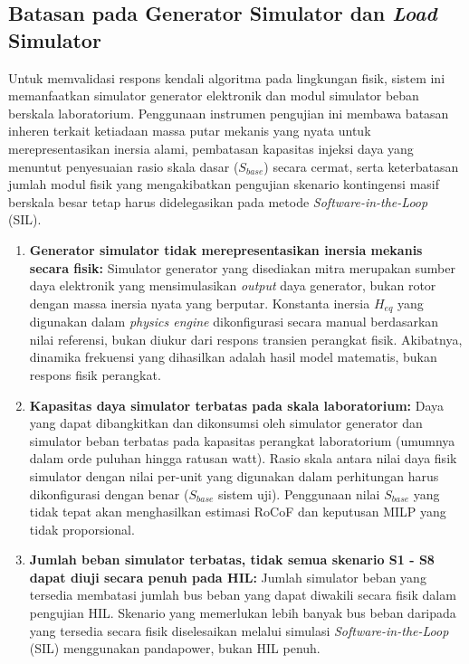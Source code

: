 \subsection{Batasan pada Generator Simulator dan \textit{Load} Simulator}
\label{subsec:Batasan_pada_Generator_Simulator_dan_Load_Simulator}

Untuk memvalidasi respons kendali algoritma pada lingkungan fisik, sistem ini memanfaatkan simulator generator elektronik dan modul simulator beban berskala laboratorium. Penggunaan instrumen pengujian ini membawa batasan inheren terkait ketiadaan massa putar mekanis yang nyata untuk merepresentasikan inersia alami, pembatasan kapasitas injeksi daya yang menuntut penyesuaian rasio skala dasar ($S_{base}$) secara cermat, serta keterbatasan jumlah modul fisik yang mengakibatkan pengujian skenario kontingensi masif berskala besar tetap harus didelegasikan pada metode \textit{Software-in-the-Loop} (SIL).

\begin{enumerate}
    \item[a.] \textbf{Generator simulator tidak merepresentasikan inersia mekanis secara fisik:} Simulator generator yang disediakan mitra merupakan sumber daya elektronik yang mensimulasikan \textit{output} daya generator, bukan rotor dengan massa inersia nyata yang berputar. Konstanta inersia $H_{eq}$ yang digunakan dalam \textit{physics engine} dikonfigurasi secara manual berdasarkan nilai referensi, bukan diukur dari respons transien perangkat fisik. Akibatnya, dinamika frekuensi yang dihasilkan adalah hasil model matematis, bukan respons fisik perangkat.
    \item[b.] \textbf{Kapasitas daya simulator terbatas pada skala laboratorium:} Daya yang dapat dibangkitkan dan dikonsumsi oleh simulator generator dan simulator beban terbatas pada kapasitas perangkat laboratorium (umumnya dalam orde puluhan hingga ratusan watt). Rasio skala antara nilai daya fisik simulator dengan nilai per-unit yang digunakan dalam perhitungan harus dikonfigurasi dengan benar ($S_{base}$ sistem uji). Penggunaan nilai $S_{base}$ yang tidak tepat akan menghasilkan estimasi RoCoF dan keputusan MILP yang tidak proporsional.
    \item[c.] \textbf{Jumlah beban simulator terbatas, tidak semua skenario S1 - S8 dapat diuji secara penuh pada HIL:} Jumlah simulator beban yang tersedia membatasi jumlah bus beban yang dapat diwakili secara fisik dalam pengujian HIL. Skenario yang memerlukan lebih banyak bus beban daripada yang tersedia secara fisik diselesaikan melalui simulasi \textit{Software-in-the-Loop} (SIL) menggunakan pandapower, bukan HIL penuh.
\end{enumerate}

